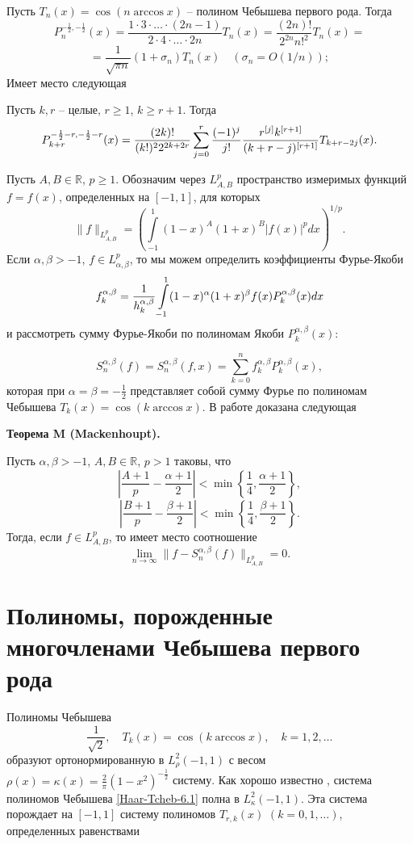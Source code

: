 Пусть $T_n(x)=\cos(n\arccos x)$ -- полином Чебышева первого рода. Тогда \cite{Haar-Tcheb-Sege}
$$P_n^{-\frac{1}{2},-\frac{1}{2}}(x)=\frac{1\cdot3\cdot\ldots\cdot(2n-1)}
{2\cdot4\cdot\ldots\cdot2n}T_n(x)=\frac{(2n)!}{2^{2n}{n!}^2}T_n(x)=$$
\begin{equation}\label{Haar-Tcheb-eq5.12}
=\frac{1}{\sqrt{\pi
n}}(1+\sigma_n)T_n(x)\quad\left(\sigma_n=O\left(1/n\right)\right);
\end{equation}
Имеет место следующая

\begin{lemma}\label{jacobi-repr}
Пусть  $k,r$ -- целые, $r\ge1$,
     $k\ge r+1$. Тогда
 $$
P_{k+r}^{-\frac12-r,-\frac12-r}(x)={(2k)!\over(k!)^22^{2k+2r}}\sum_{j=0}^r{(-1)^j\over j!}
{r^{[j]}k^{[r+1]}\over(k+r-j)^{[r+1]}}T_{k+r-2j}(x).
     $$
\end{lemma}

Пусть $A,B\in \mathbb{R} $,  $p\ge1$. Обозначим через $ L^p_{A,B}$ пространство измеримых функций $f=f(x)$,
определенных на $[-1,1]$, для которых
     $$
\|f\|_{L^p_{A,B}}= \left(\int\limits_{-1}^1
(1-x)^A(1+x)^B|f(x)|^pdx\right)^{1/p}.
     $$
Если $\alpha,\beta>-1$, $f\in  L^p_{\alpha,\beta}$, то мы можем определить коэффициенты
     Фурье-Якоби
          $$
          f^{\alpha,\beta}_k={1\over h_k^{\alpha,\beta}}
       \int\limits_{-1}^1(1-x)^\alpha(1+x)^\beta
f(x)P_k^{\alpha,\beta}(x)dx
          $$
 и рассмотреть сумму Фурье-Якоби   по полиномам Якоби $P_k^{\alpha,\beta}(x)$:

     $$
S_n^{\alpha,\beta}(f)=S_n^{\alpha,\beta}(f,x)= \sum_{k=0}^n
f_k^{\alpha,\beta} P_k^{\alpha,\beta}(x),
     $$
которая при $\alpha=\beta=-\frac12$ представляет собой  \cite{Haar-Tcheb-Sege} сумму Фурье по полиномам Чебышева $T_k(x)=\cos(k\arccos x)$.  В работе \cite{Haar-Tcheb-Muckenhoupt} доказана следующая

 \textbf{Теорема M (Mackenhoupt).}

Пусть $\alpha,\beta>-1$, $A,B\in\mathbb{R}$,  $p>1$ таковы, что
$$
\left|\frac{A+1}{p}-\frac{\alpha+1}{2}\right|<
\min\left\{\frac{1}{4},\frac{\alpha+1}{2}\right\},
$$
$$
\left|\frac{B+1}{p}-\frac{\beta+1}{2}\right|<\min\left\{\frac{1}{4},\frac{\beta+1}{2}\right\}.
$$
Тогда, если $f\in L^p_{A,B}$, то имеет место соотношение
$$
\lim_{n\to\infty}\|f-S_n^{\alpha,\beta}(f)\|_{L^p_{A,B}}=0.
$$


\section{Полиномы, порожденные многочленами Чебышева первого рода}
    Полиномы Чебышева
\begin{equation}\label{Haar-Tcheb-6.1}
\frac{1}{\sqrt{2}},\quad T_k(x)=\cos(k\arccos x), \quad k=1,2,\ldots
\end{equation}
образуют ортонормированную  в $L_\rho^2(-1,1)$ с весом  $\rho(x)=\kappa(x)=\frac2\pi(1-x^2)^{-\frac12}$ систему. Как хорошо известно \cite{Haar-Tcheb-Sege}, система полиномов Чебышева \eqref{Haar-Tcheb-6.1} полна в $L_\kappa^2(-1,1)$.   Эта система порождает на $[-1,1]$ систему полиномов $T_{r,k}(x)$ $(k=0,1,\ldots)$, определенных равенствами

